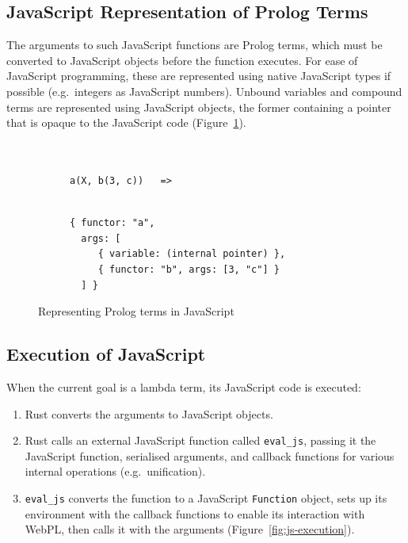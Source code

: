 \subsection{JavaScript Representation of Prolog Terms}

\label{sec:js-prolog-mapping}

The arguments to such JavaScript functions are Prolog terms, which must be converted to JavaScript objects before the function executes. For ease of JavaScript programming, these are represented using native JavaScript types if possible (e.g.\ integers as JavaScript numbers). Unbound variables and compound terms are represented using JavaScript objects, the former containing a pointer that is opaque to the JavaScript code (Figure~\ref{fig:prolog-js-mapping}).

\begin{figure}[H]
\centering
\begin{subfigure}{0.3\textwidth}
\centering
\begin{verbatim}


a(X, b(3, c))   =>


\end{verbatim}
\end{subfigure}%
\begin{subfigure}{0.7\textwidth}
\centering
\begin{verbatim}
{ functor: "a",
  args: [
     { variable: (internal pointer) },
     { functor: "b", args: [3, "c"] }
  ] }
\end{verbatim}
\end{subfigure}
\caption{Representing Prolog terms in JavaScript}
\label{fig:prolog-js-mapping}
\end{figure}

\subsection{Execution of JavaScript}

When the current goal is a lambda term, its JavaScript code is executed:

\begin{enumerate}
\item Rust converts the arguments to JavaScript objects.
\item Rust calls an external JavaScript function called \texttt{eval\_js}, passing it the JavaScript function, serialised arguments, and callback functions for various internal operations (e.g.\ unification).
\item \texttt{eval\_js} converts the function to a JavaScript \texttt{Function} object, sets up its environment with the callback functions to enable its interaction with WebPL, then calls it with the arguments (Figure~\ref{fig:js-execution}).
\end{enumerate}

